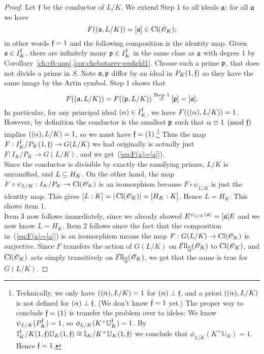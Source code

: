 \begin{proof}
 Let $\mathfrak{f}$ be the conductor of $L/K$. 
We extend Step 1 to all ideals $\mathfrak{a}$: for all $\mathfrak{a}$ we have
\[
F((\mathfrak{a},L/K))=[\mathfrak{a}]\in \operatorname{Cl}(\mathscr{O}_K);
\]
in other words $\mathfrak{f}=1$ and the following composition is the identity map.
\eeq
Given $\mathfrak{a}\in I_K^{\mathfrak{f}}$, there are infinitely many $\mathfrak{p}\in I_K^{\mathfrak{f}}$ in the same class as $\mathfrak{a}$ with degree 1 by Corollary~\ref{ch:cft-app}.\ref{cor:chebotarev-resfield1}. 
Choose such a prime $\mathfrak{p}$, that does not divide a prime in $S$. 
Note $\mathfrak{a},\mathfrak{p}$ differ by an ideal in $P_K(1,\mathfrak{f})$ so they have the same image by the Artin symbol. Step 1 shows that
\[
F((\mathfrak{a},L/K))=F((\mathfrak{p},L/K))\stackrel{\text{Step 1}}=[\mathfrak{p}]=[\mathfrak{a}].
\]
In particular, for any principal ideal $(\alpha)\in I_K^{\mathfrak{f}}$, we have $F(((\alpha),L/K))=1$. However, by definition the conductor is the smallest $\mathfrak{p}$ such that $\alpha\equiv 1\pmod{\mathfrak{f}}$ implies $((\alpha),L/K)=1$, so we must have $\mathfrak{f}=(1)$.\footnote{
Technically, we only have $((\alpha),L/K)=1$ for $(\alpha)\perp\mathfrak{f}$, and a priori $((\alpha),L/K)$ is not defined for $(\alpha)\perp \mathfrak{f}$. (We don't know $\mathfrak{f}=1$ yet.) The proper way to conclude $\mathfrak{f}=(1)$ is transfer the problem over to ideles: We know $\psi_{L/K}(P_K^{\mathfrak{f}})=1$, so $\phi_{L/K}(K^{\times}\mathbb U_K^{\mathfrak{f}})=1$. By $\mathbb{I}_K^{\mathfrak{f}}/K(1,\mathfrak{f})\mathbb U_K(1,\mathfrak{f})\cong \mathbb{I}_K/K^{\times}\mathbb U_K(1,\mathfrak{f})$ we conclude that $\phi_{L/K}(K^{\times}\mathbb U_K)=1$. Hence $\mathfrak{f} =1$.
}
Thus the map $F:I_K^{\mathfrak{f}}/P_K(1,\mathfrak{f})\to G(L/K)$ we had originally is actually just $F:I_K/P_K\to G(L/K)$, and we get~(\ref{eq:F(a)=[a]}).\\

Since the conductor is divisible by exactly the ramifying primes, $L/K$ is unramified, and $L\subseteq H_K$. On the other hand, the map $F\circ \psi_{L/K}:I_K/P_K\to \operatorname{Cl}(\mathscr{O}_K)$ is an isomorphism because $F\circ \psi_{L/K}$ is just the identity map. This gives $[L:K]=|\operatorname{Cl}(\mathscr{O}_K)|=[H_K:K]$. Hence $L=H_K$. This shows item 1.\\

Item 3 now follows immediately, since we already showed $E^{\psi_{L/K}(\mathfrak{a})}=[\mathfrak{a}]E$ and we now know $L=H_K$. Item 2 follows since the fact that the composition in~(\ref{eq:F(a)=[a]}) is an isomorphism means the map $F:G(L/K)\to \operatorname{Cl}(\mathscr{O}_K)$ is surjective. Since $F$ transfers the action of $G(L/K)$ on $\mathcal{E}{\rm{ll}}_{\overline{\mathbb{Q}}}(\mathscr{O}_K)$ to $\operatorname{Cl}(\mathscr{O}_K)$, and $\operatorname{Cl}(\mathscr{O}_K)$ acts simply transitively on $\mathcal{E}{\rm{ll}}_{\overline{\mathbb{Q}}}(\mathscr{O}_K)$, we get that the same is true for $G(L/K)$. %
\end{proof}
